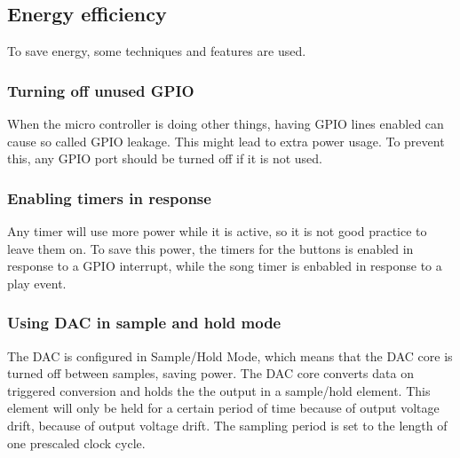 \subsection{Energy efficiency}
To save energy, some techniques and features are used.

\subsubsection{Turning off unused GPIO}
When the micro controller is doing other things, having GPIO lines enabled can cause so called GPIO leakage.
This might lead to extra power usage.
To prevent this, any GPIO port should be turned off if it is not used.

\subsubsection{Enabling timers in response}
Any timer will use more power while it is active, so it is not good practice to leave them on.
To save this power, the timers for the buttons is enabled in response to a GPIO interrupt, while the song timer is enbabled in response to a play event. 

\subsubsection{Using DAC in sample and hold mode}
The DAC is configured in Sample/Hold Mode, which means that the DAC core is turned off between samples, saving power.
The DAC core converts data on triggered conversion and holds the the output in a sample/hold element.
This element will only be held for a certain period of time because of output voltage drift, because of output voltage drift.
The sampling period is set to the length of one prescaled clock cycle.

